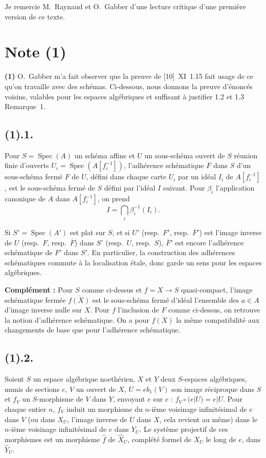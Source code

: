 \documentclass[12pt,a4paper]{article}
\theoremstyle{plain}
\theoremstyle{definition}
\theoremstyle{remark}
\DeclareMathOperator{\Spec}{Spec}
\begin{document}
\vspace{1em}

Je remercie M.~Raynaud et O.~Gabber d'une lecture critique d'une première version de ce texte.


\section*{Note (1)}

\textbf{(1)} O.~Gabber m'a fait observer que la preuve de [10]~XI~1.15 fait usage de ce qu'on travaille avec des schémas. Ci-dessous, nous donnons la preuve d'énoncés voisins, valables pour les espaces algébriques et suffisant à justifier 1.2 et 1.3 Remarque~1.

\subsection*{\textbf{(1).1.}}
Pour $S = \Spec(A)$ un schéma affine et $U$ un sous-schéma ouvert de $S$ réunion finie d'ouverts $U_i = \Spec(A[f_i^{-1}])$, l'adhérence schématique $\overline{F}$ dans $S$ d'un sous-schéma fermé $F$ de $U$, défini dans chaque carte $U_i$ par un idéal $I_i$ de $A[f_i^{-1}]$, est le sous-schéma fermé de $S$ défini par l'idéal $I$ suivant. Pour $\beta_i$ l'application canonique de $A$ dans $A[f_i^{-1}]$, on prend
\[
I = \bigcap_i \beta_i^{-1}(I_i).
\]

Si $S' = \Spec(A')$ est plat sur $S$, et si $U'$ (resp.~$F'$, resp.~$\overline{F}'$) est l'image inverse de $U$ (resp.~$F$, resp.~$\overline{F}$) dans $S'$ (resp.~$U$, resp.~$S$), $\overline{F}'$ est encore l'adhérence schématique de $F'$ dans $S'$. En particulier, la construction des adhérences schématiques commute à la localisation étale, donc garde un sens pour les espaces algébriques.

\textbf{Complément :} Pour $S$ comme ci-dessus et $f = X \to S$ quasi-compact, l'image schématique fermée $\overline{f(X)}$ est le sous-schéma fermé d'idéal l'ensemble des $a \in A$ d'image inverse nulle sur $X$. Pour $f$ l'inclusion de $F$ comme ci-dessus, on retrouve la notion d'adhérence schématique. On a pour $\overline{f(X)}$ la même compatibilité aux changements de base que pour l'adhérence schématique.

\subsection*{\textbf{(1).2.}}
Soient $S$ un espace algébrique noethérien, $X$ et $Y$ deux $S$-espaces algébriques, munis de sections $e$, $V$ un ouvert de $X$, $U = eb_1(V)$ son image réciproque dans $S$ et $f_V$ un $S$-morphisme de $V$ dans $Y$, envoyant $e$ sur $e$ : $f_V \circ (e|U) = e|U$. Pour chaque entier $n$, $f_V$ induit un morphisme du $n$-ième voisinage infinitésimal de $e$ dans $V$ (ou dans $X_U$, l'image inverse de $U$ dans $X$, cela revient au même) dans le $n$-ième voisinage infinitésimal de $e$ dans $Y_U$. Le système projectif de ces morphismes est un morphisme $\hat{f}$ de $\hat{X}_U$, complété formel de $X_U$ le long de $e$, dans $\hat{Y}_U$.
\end{document}
